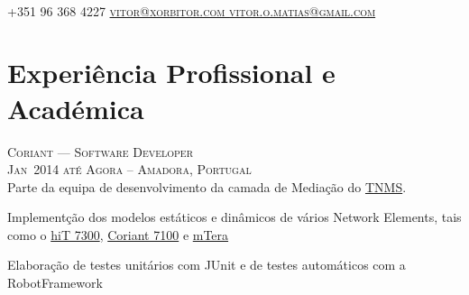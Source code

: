 \documentclass[a4paper,fontsize=10pt]{scrartcl} %
\begin{document}
\color{text1} %
\\
\textsc{%
\large{+351 96 368 4227
{\tiny{\textcolor{bullets}{}}}
\href{mailto:vitor@xorbitor.com,vitor.o.matias@gmail.com}{vitor@xorbitor.com {\tiny{\textcolor{bullets}{}}} vitor.o.matias@gmail.com}}}\\

\color{text1}

\begin{minipage}[t]{0.5\textwidth} 
\vspace{0pt}	%

\section{Experiência Profissional e Académica}


\textsc{Coriant --- Software Developer}\\
\small\textsc{Jan~2014 até Agora -- Amadora, Portugal}\\ \normalsize
Parte da equipa de desenvolvimento da camada de Media\c{c}ão do \href{http://www.coriant.com/products/tnms.asp}{TNMS}.\\
\begin{inparaitem} 
	\item[] Implement\c{c}ão dos modelos estáticos e dinâmicos de vários Network Elements, 
	tais como o \href{http://www.coriant.com/products/hit7300.asp}{hiT 7300},
	\href{http://www.coriant.com/products/7100.asp}{Coriant 7100} e \href{http://www.coriant.com/products/mtera.asp}{mTera}
	\item Elaboração de testes unitários com JUnit e de testes automáticos com a RobotFramework
\end{inparaitem}
\\\par



\end{minipage}
\end{document}
